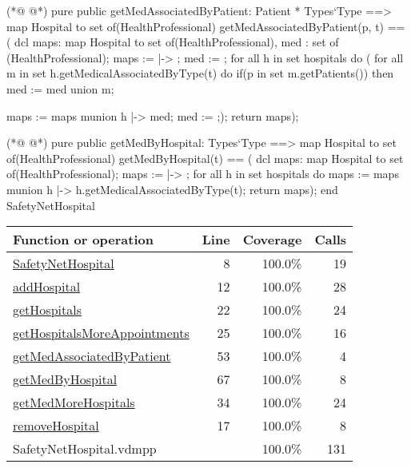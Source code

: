 \begin{vdmpp}[breaklines=true]
(*@
\label{getMedAssociatedByPatient:53}
@*)
 pure public getMedAssociatedByPatient: Patient * Types`Type ==> map Hospital to set of(HealthProfessional)
  getMedAssociatedByPatient(p, t) == (
                     dcl maps: map Hospital to set of(HealthProfessional), med : set of (HealthProfessional);
                     maps := { |-> };
                     med := {};
                     for all h in set hospitals do (
                      for all m in set h.getMedicalAssociatedByType(t) do
                       if(p in set m.getPatients())
                        then med := med union {m};
                       
                      maps := maps munion {h |-> med};
                      med := {};);
                      return maps);
 
(*@
\label{getMedByHospital:67}
@*)
 pure public getMedByHospital: Types`Type ==> map Hospital to set of(HealthProfessional)
  getMedByHospital(t) == (
                     dcl maps: map Hospital to set of(HealthProfessional);
                     maps := { |-> };
                     for all h in set hospitals do
                      maps := maps munion {h |-> h.getMedicalAssociatedByType(t)};
                     return maps);
end SafetyNetHospital
\end{vdmpp}
\bigskip
\begin{longtable}{|l|r|r|r|}
\hline
Function or operation & Line & Coverage & Calls \\
\hline
\hline
\hyperref[SafetyNetHospital:8]{SafetyNetHospital} & 8&100.0\% & 19 \\
\hline
\hyperref[addHospital:12]{addHospital} & 12&100.0\% & 28 \\
\hline
\hyperref[getHospitals:22]{getHospitals} & 22&100.0\% & 24 \\
\hline
\hyperref[getHospitalsMoreAppointments:25]{getHospitalsMoreAppointments} & 25&100.0\% & 16 \\
\hline
\hyperref[getMedAssociatedByPatient:53]{getMedAssociatedByPatient} & 53&100.0\% & 4 \\
\hline
\hyperref[getMedByHospital:67]{getMedByHospital} & 67&100.0\% & 8 \\
\hline
\hyperref[getMedMoreHospitals:34]{getMedMoreHospitals} & 34&100.0\% & 24 \\
\hline
\hyperref[removeHospital:17]{removeHospital} & 17&100.0\% & 8 \\
\hline
\hline
SafetyNetHospital.vdmpp & & 100.0\% & 131 \\
\hline
\end{longtable}

